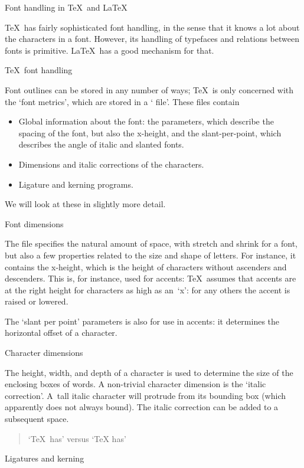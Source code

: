  {Font handling in \TeX\ and \LaTeX}

\TeX\ has fairly sophisticated font handling, in the sense that it
knows a lot about the characters in a font. However, its handling of
typefaces and relations between fonts is primitive. \LaTeX\ has a good
mechanism for that.

 {\TeX\ font handling}

Font outlines can be
stored in any number of ways; \TeX\ is only concerned with the
`font metrics', which are stored in a ` file'. These files contain
\begin{itemize}
\item Global information about the font: the 
  parameters, which describe the spacing of the font, but also the
  x-height, and the slant-per-point, which describes the angle of
  italic and slanted fonts.
\item Dimensions and italic corrections of the characters.
\item Ligature and kerning programs.
\end{itemize}
We will look at these in slightly more detail.

 {Font dimensions}

The  file specifies the natural amount of space, with stretch
and shrink for a font, but also a few properties related to the size
and shape of letters. For instance, it contains the x-height, which is
the height of characters without ascenders and descenders. This is,
for instance,
used for accents: \TeX\ assumes that accents are at the
right height for characters as high as an~`x': for any others the
accent is raised or lowered.

The `slant per point' parameters is also for use in accents: it
determines the horizontal offset of a character.

 {Character dimensions}

The height, width, and depth of a character is used to determine the
size of the enclosing boxes of words. A non-trivial character
dimension is the `italic correction'. A~tall
italic character will protrude from its bounding box (which apparently
does not always bound). The italic correction can be added to a
subsequent space.
\begin{quote}
`\TeX\ has' versus `\TeX\/ has'
\end{quote}

 {Ligatures and kerning}

